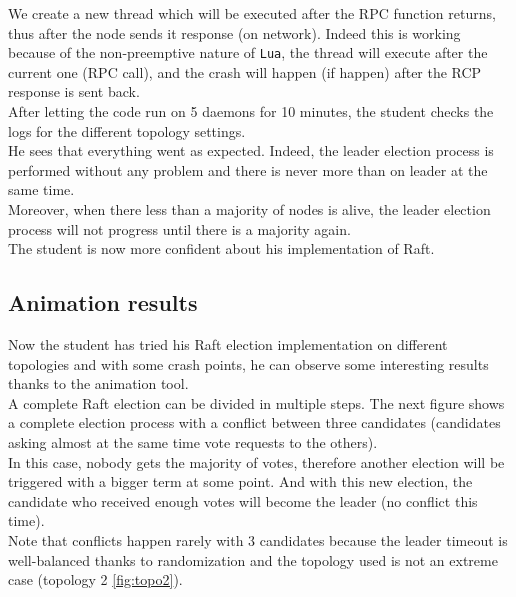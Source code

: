 \documentclass{eplmastersthesis}
\begin{document}
        We create a new thread which will be executed after the RPC function
        returns, thus after the node sends it response (on network). Indeed this is
        working because of the non-preemptive nature of \texttt{Lua}, the thread
        will execute after the current one (RPC call), and the crash will happen (if happen)
        after the RCP response is sent back.\\

        After letting the code run on 5 daemons for 10 minutes, the student
        checks the logs for the different topology settings.\\
        He sees that everything went as expected. Indeed, the leader
        election process is performed without any problem and there is never
        more than on leader at the same time.\\
        Moreover, when there less than a majority of nodes is alive, the leader
        election process will not progress until there is a majority again.\\
        The student is now more confident about his implementation of Raft.

      \subsection{Animation results}

        Now the student has tried his Raft election implementation on
        different topologies and with some crash points, he can observe some
        interesting results thanks to the animation tool.\\
        A complete Raft election can be divided in multiple steps. The next
        figure shows a complete election process with a conflict between
        three candidates (candidates asking almost at the same time vote
        requests to the others).\\
        In this case, nobody gets the majority of votes, therefore another
        election will be triggered with a bigger term at some point.
        And with this new election, the candidate who received enough votes
        will become the leader (no conflict this time).\\
        Note that conflicts happen rarely with 3 candidates because the
        leader timeout is well-balanced thanks to randomization and the
        topology used is not an extreme case (topology 2 \ref{fig:topo2}).
\end{document}
